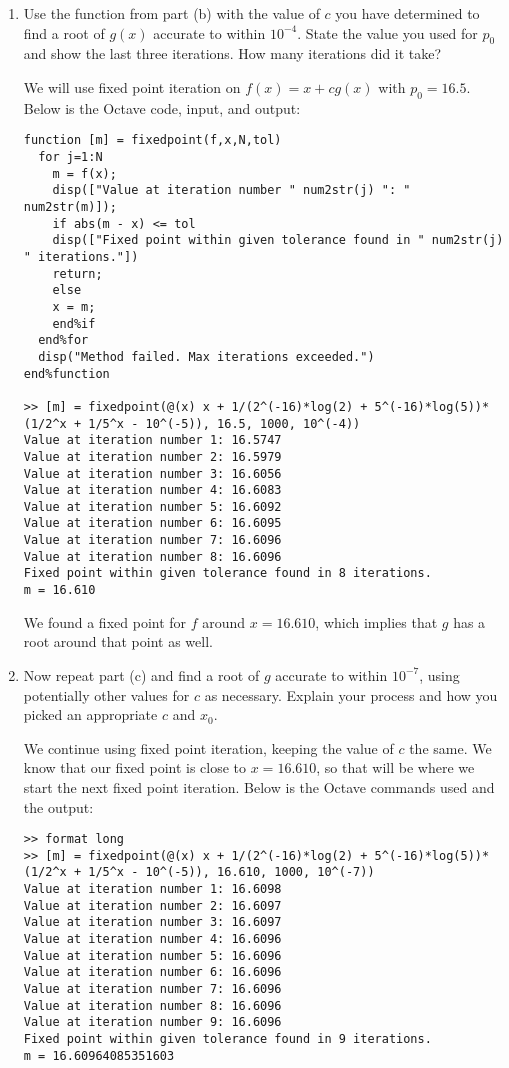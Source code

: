 \documentclass{eh-homework}
\begin{document}
\begin{question}{1}
\begin{enumerate}[label=\alph*.]
        \item Use the function from part (b) with the value of \(c\) you have determined to find a root of \(g(x)\) accurate to within \(10^{-4}\). State the value you used for \(p_0\) and show the last three iterations. How many iterations did it take?
        
        We will use fixed point iteration on \(f(x) = x + cg(x)\) with \(p_0 = 16.5\). Below is the Octave code, input, and output:
        \begin{lstlisting}
function [m] = fixedpoint(f,x,N,tol)
  for j=1:N
    m = f(x);
    disp(["Value at iteration number " num2str(j) ": " num2str(m)]);
    if abs(m - x) <= tol
    disp(["Fixed point within given tolerance found in " num2str(j) " iterations."])
    return;
    else
    x = m;
    end%if
  end%for
  disp("Method failed. Max iterations exceeded.")
end%function

>> [m] = fixedpoint(@(x) x + 1/(2^(-16)*log(2) + 5^(-16)*log(5))*(1/2^x + 1/5^x - 10^(-5)), 16.5, 1000, 10^(-4))
Value at iteration number 1: 16.5747
Value at iteration number 2: 16.5979
Value at iteration number 3: 16.6056
Value at iteration number 4: 16.6083
Value at iteration number 5: 16.6092
Value at iteration number 6: 16.6095
Value at iteration number 7: 16.6096
Value at iteration number 8: 16.6096
Fixed point within given tolerance found in 8 iterations.
m = 16.610
        \end{lstlisting}

        We found a fixed point for \(f\) around \(x = 16.610\), which implies that \(g\) has a root around that point as well.
    
        \item Now repeat part (c) and find a root of \(g\) accurate to within \(10^{-7}\), using potentially other values for \(c\) as necessary. Explain your process and how you picked an appropriate \(c\) and \(x_0\).
        
        We continue using fixed point iteration, keeping the value of \(c\) the same. We know that our fixed point is close to \(x = 16.610\), so that will be where we start the next fixed point iteration. Below is the Octave commands used and the output:
        \begin{lstlisting}
>> format long
>> [m] = fixedpoint(@(x) x + 1/(2^(-16)*log(2) + 5^(-16)*log(5))*(1/2^x + 1/5^x - 10^(-5)), 16.610, 1000, 10^(-7))
Value at iteration number 1: 16.6098
Value at iteration number 2: 16.6097
Value at iteration number 3: 16.6097
Value at iteration number 4: 16.6096
Value at iteration number 5: 16.6096
Value at iteration number 6: 16.6096
Value at iteration number 7: 16.6096
Value at iteration number 8: 16.6096
Value at iteration number 9: 16.6096
Fixed point within given tolerance found in 9 iterations.
m = 16.60964085351603
        \end{lstlisting}
    \end{enumerate}
    \end{question}
\end{document}
